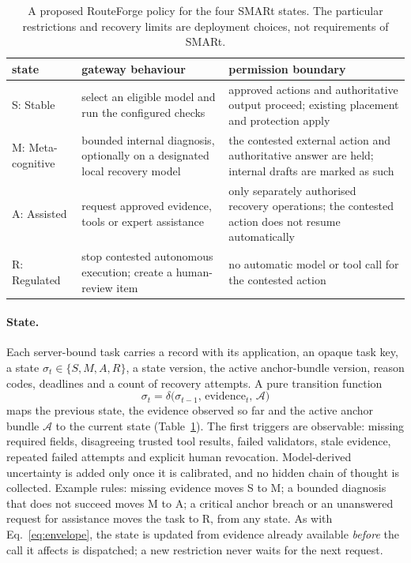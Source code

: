 \documentclass[11pt]{article}
\begin{document}
\begin{table}[t]
\centering
\small
\caption{A proposed RouteForge policy for the four SMARt states. The particular restrictions and
recovery limits are deployment choices, not requirements of SMARt.}
\label{tab:smart}
\begin{tabular}{@{}p{2.3cm}p{5.4cm}p{6.2cm}@{}}
\toprule
state & gateway behaviour & permission boundary \\
\midrule
S: Stable & select an eligible model and run the configured checks &
  approved actions and authoritative output proceed; existing placement and protection apply \\
M: Meta-cognitive & bounded internal diagnosis, optionally on a designated local recovery model &
  the contested external action and authoritative answer are held; internal drafts are marked
  as such \\
A: Assisted & request approved evidence, tools or expert assistance &
  only separately authorised recovery operations; the contested action does not resume
  automatically \\
R: Regulated & stop contested autonomous execution; create a human-review item &
  no automatic model or tool call for the contested action \\
\bottomrule
\end{tabular}
\end{table}

\paragraph{State.} Each server-bound task carries a record with its application, an opaque task
key, a state $\sigma_t \in \{S, M, A, R\}$, a state version, the active anchor-bundle version,
reason codes, deadlines and a count of recovery attempts. A pure transition function
\begin{equation}
  \sigma_t = \delta\bigl(\sigma_{t-1},\, \mathrm{evidence}_t,\, \mathcal{A}\bigr)
  \label{eq:smartdelta}
\end{equation}
maps the previous state, the evidence observed so far and the active anchor bundle
$\mathcal{A}$ to the current state (Table~\ref{tab:smart}). The first triggers are observable:
missing required fields, disagreeing trusted tool results, failed validators, stale evidence,
repeated failed attempts and explicit human revocation. Model-derived uncertainty is added only
once it is calibrated, and no hidden chain of thought is collected. Example rules: missing
evidence moves S to M; a bounded diagnosis that does not succeed moves M to A; a critical
anchor breach or an unanswered request for assistance moves the task to R, from any state. As
with Eq.~\eqref{eq:envelope}, the state is updated from evidence already available
\emph{before} the call it affects is dispatched; a new restriction never waits for the next
request.
\end{document}
